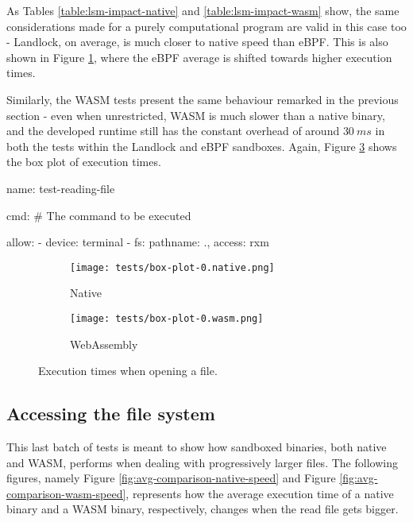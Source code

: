 As Tables \ref{table:lsm-impact-native} and \ref{table:lsm-impact-wasm} show,
the same considerations made for a purely computational program are valid in this case too
- Landlock, on average, is much closer to native speed than eBPF.
This is also shown in Figure \ref{fig:distribution-opening-native}, where the eBPF average is shifted towards
higher execution times.

Similarly, the WASM tests present the same behaviour remarked in the previous section -
even when unrestricted, WASM is much slower than a native binary, and the developed runtime
still has the constant overhead of around $30\ ms$ in both the tests within the Landlock and eBPF sandboxes.
Again, Figure \ref{fig:distribution-opening-wasm} shows the box plot of execution times.

\vspace*{1cm}

\begin{code}[language=yaml, caption=The outline of the policy used for testing the reading program., label=lst:outline-policy-reading-test]
name: test-reading-file

cmd: # The command to be executed

allow:
  - device: terminal
  - fs: {pathname: ., access: rxm}
\end{code}

\clearpage
\begin{figure}[ht]
  \centering
  \begin{subfigure}[b]{0.49\linewidth}
    \centering
    \texttt{[image: tests/box-plot-0.native.png]}
    \caption{Native}
    \label{fig:distribution-opening-native}
  \end{subfigure}
  \begin{subfigure}[b]{0.49\linewidth}
    \centering
    \texttt{[image: tests/box-plot-0.wasm.png]}
    \caption{WebAssembly}
    \label{fig:distribution-opening-wasm}
  \end{subfigure}

  \caption{Execution times when opening a file.}
\end{figure}

\subsection{Accessing the file system}

This last batch of tests is meant to show how sandboxed binaries, both native and WASM, performs when
dealing with progressively larger files.
The following figures, namely Figure \ref{fig:avg-comparison-native-speed} and Figure \ref{fig:avg-comparison-wasm-speed},
represents how the average execution time of a native binary and a WASM binary, respectively, changes
when the read file gets bigger.

